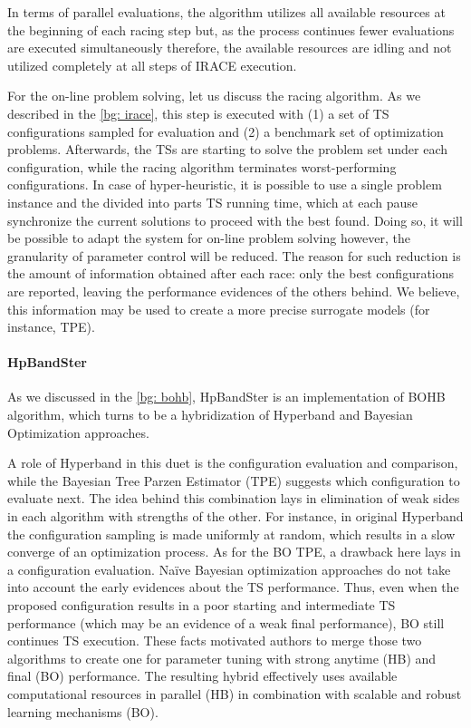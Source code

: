 In terms of parallel evaluations, the algorithm utilizes all available resources at the beginning of each racing step but, as the process continues fewer evaluations are executed simultaneously therefore, the available resources are idling and not utilized completely at all steps of IRACE execution.

For the on-line problem solving, let us discuss the racing algorithm. As we described in the \cref{bg: irace}, this step is executed with (1) a set of TS configurations sampled for evaluation and (2) a benchmark set of optimization problems. Afterwards, the TSs are starting to solve the problem set under each configuration, while the racing algorithm terminates worst-performing configurations. In case of hyper-heuristic, it is possible to use a single problem instance and the divided into parts TS running time, which at each pause synchronize the current solutions to proceed with the best found. Doing so, it will be possible to adapt the system for on-line problem solving however, the granularity of parameter control will be reduced. The reason for such reduction is the amount of information obtained after each race: only the best configurations are reported, leaving the performance evidences of the others behind. We believe, this information may be used to create a more precise surrogate models (for instance, TPE).

\paragraph{HpBandSter} As we discussed in the \cref{bg: bohb}, HpBandSter is an implementation of BOHB algorithm, which turns to be a hybridization of Hyperband and Bayesian Optimization approaches.

A role of Hyperband in this duet is the configuration evaluation and comparison, while the Bayesian Tree Parzen Estimator (TPE) suggests which configuration to evaluate next. The idea behind this combination lays in elimination of weak sides in each algorithm with strengths of the other. For instance, in original Hyperband the configuration sampling is made uniformly at random, which results in a slow converge of an optimization process. As for the BO TPE, a drawback here lays in a configuration evaluation. Na\"ive Bayesian optimization approaches do not take into account the early evidences about the TS performance. Thus, even when the proposed configuration results in a poor starting and intermediate TS performance (which may be an evidence of a weak final performance), BO still continues TS execution. These facts motivated authors to merge those two algorithms to create one for parameter tuning with strong anytime (HB) and final (BO) performance. The resulting hybrid effectively uses available computational resources in parallel (HB) in combination with scalable and robust learning mechanisms (BO).

